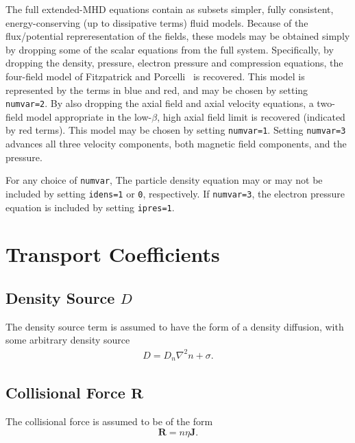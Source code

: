 \documentclass[letterpaper]{book}
\renewcommand{\vec}[1]{\ensuremath{\mathbf{#1}}}
\newcommand{\R}{\vec{R}}
\renewcommand{\j}{\vec{J}}
\begin{document}
The full extended-MHD equations contain as subsets simpler, fully
consistent, energy-conserving (up to dissipative terms) fluid models.
Because of the flux/po\-ten\-tial repreresentation of the fields,
these models may be obtained simply by dropping some of the scalar
equations from the full system.  Specifically, by dropping the
density, pressure, electron pressure and compression equations, the
four-field model of Fitzpatrick and Porcelli~\cite{Fitzpatrick04} is
recovered.  This model is represented by the terms in blue and red,
and may be chosen by setting \texttt{numvar=2}.  By also dropping the
axial field and axial velocity equations, a two-field model
appropriate in the low-$\beta$, high axial field limit is recovered
(indicated by red terms).  This model may be chosen by setting
\texttt{numvar=1}.  Setting \texttt{numvar=3} advances all three
velocity components, both magnetic field components, and the pressure.

For any choice of \texttt{numvar}, The particle density equation may
or may not be included by setting \texttt{idens=1} or \texttt{0},
respectively.  If \texttt{numvar=3}, the electron pressure equation is
included by setting \texttt{ipres=1}.


\section{Transport Coefficients \label{sec:transport_coefficients}}


\subsection{Density Source $D$}

The density source term is assumed to have the form of a density
diffusion, with some arbitrary density source
\begin{eqnarray}
  D = D_n \nabla^2 n + \sigma.
\end{eqnarray}


\subsection{Collisional Force $\R$}

The collisional force is assumed to be of the form
\begin{equation}
  \label{eq:collisional_force}
  \R = n \eta \j.
\end{equation}
\end{document}
